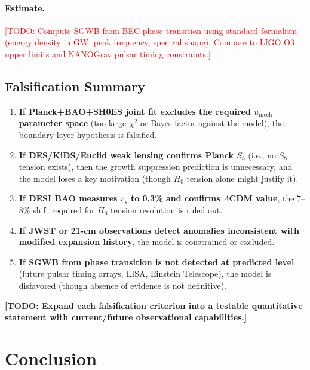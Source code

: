 \documentclass[11pt,a4paper]{article}
\newcommand{\umech}{\ensuremath{u_{\mathrm{mech}}}}
\theoremstyle{definition}
\theoremstyle{remark}
\begin{document}
\paragraph{Estimate.}
\textcolor{red}{[TODO: Compute SGWB from BEC phase transition using standard formalism (energy density in GW, peak frequency, spectral shape). Compare to LIGO O3 upper limits and NANOGrav pulsar timing constraints.]}

\subsection{Falsification Summary}
\label{sec:falsification}

\begin{enumerate}[leftmargin=*, itemsep=0.3em]
\item \textbf{If Planck+BAO+SH0ES joint fit excludes the required $\umech$ parameter space} (too large $\chi^2$ or Bayes factor against the model), the boundary-layer hypothesis is falsified.
\item \textbf{If DES/KiDS/Euclid weak lensing confirms Planck $S_8$} (i.e., no $S_8$ tension exists), then the growth suppression prediction is unnecessary, and the model loses a key motivation (though $H_0$ tension alone might justify it).
\item \textbf{If DESI BAO measures $r_s$ to 0.3\% and confirms $\Lambda$CDM value}, the $7$--$8\%$ shift required for $H_0$ tension resolution is ruled out.
\item \textbf{If JWST or 21-cm observations detect anomalies inconsistent with modified expansion history}, the model is constrained or excluded.
\item \textbf{If SGWB from phase transition is not detected at predicted level} (future pulsar timing arrays, LISA, Einstein Telescope), the model is disfavored (though absence of evidence is not definitive).
\end{enumerate}

\textbf{[TODO: Expand each falsification criterion into a testable quantitative statement with current/future observational capabilities.]}

\section{Conclusion}
\label{sec:conclusion}
\end{document}
